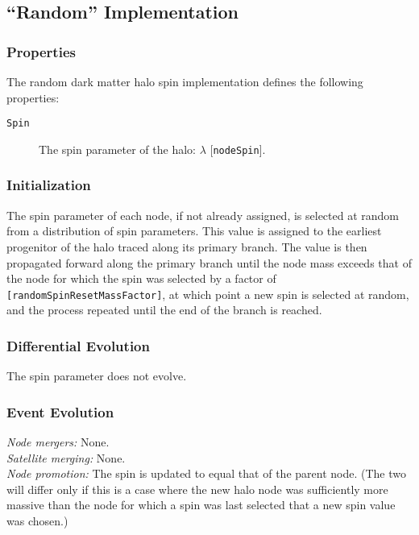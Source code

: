 \subsection{``Random'' Implementation}

\subsubsection{Properties}

The random dark matter halo spin implementation defines the following properties:
\begin{description}
 \item [{\tt Spin}] The spin parameter of the halo: $\lambda$ [{\tt nodeSpin}].
\end{description}

\subsubsection{Initialization}

The spin parameter of each node, if not already assigned, is selected at random from a distribution of spin parameters. This value is assigned to the earliest progenitor of the halo traced along its primary branch. The value is then propagated forward along the primary branch until the node mass exceeds that of the node for which the spin was selected by a factor of {\tt [randomSpinResetMassFactor]}, at which point a new spin is selected at random, and the process repeated until the end of the branch is reached. 

\subsubsection{Differential Evolution}

The spin parameter does not evolve.

\subsubsection{Event Evolution}

\noindent\emph{Node mergers:} None.\\

\noindent\emph{Satellite merging:} None.\\

\noindent\emph{Node promotion:} The spin is updated to equal that of the parent node. (The two will differ only if this is a case where the new halo node was sufficiently more massive than the node for which a spin was last selected that a new spin value was chosen.)\\


